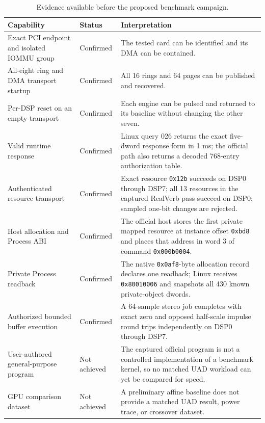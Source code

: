 \documentclass[10pt,twocolumn,twoside]{article}
\begin{document}
\begin{table}[t]
\centering
\caption{Evidence available before the proposed benchmark campaign.}
\label{tab:evidence}
\small
\begin{tabularx}{0.97\textwidth}{@{}p{}p{}X@{}}
\toprule
Capability & Status & Interpretation \\
\midrule
Exact PCI endpoint and isolated IOMMU group & Confirmed & The tested card can be identified and its DMA can be contained. \\
All-eight ring and DMA transport startup & Confirmed & All 16 rings and 64 pages can be published and recovered. \\
Per-DSP reset on an empty transport & Confirmed & Each engine can be pulsed and returned to its baseline without changing the other seven. \\
Valid runtime response & Confirmed & Linux query 026 returns the exact five-dword response form in 1 ms; the official path also returns a decoded 768-entry authorization table. \\
Authenticated resource transport & Confirmed & Exact resource \texttt{0x12b} succeeds on DSP0 through DSP7; all 13 resources in the captured RealVerb pass succeed on DSP0; sampled one-bit changes are rejected. \\
Host allocation and Process ABI & Confirmed & The official host stores the first private mapped resource at instance offset \texttt{0xbd8} and places that address in word 3 of command \texttt{0x000b0004}. \\
Private Process readback & Confirmed & The native \texttt{0x0af8}-byte allocation record declares one readback; Linux receives \texttt{0x80010006} and snapshots all 430 known private-object dwords. \\
Authorized bounded buffer execution & Confirmed & A 64-sample stereo job completes with exact zero and opposed half-scale impulse round trips independently on DSP0 through DSP7. \\
User-authored general-purpose program & Not achieved & The captured official program is not a controlled implementation of a benchmark kernel, so no matched UAD workload can yet be compared for speed. \\
GPU comparison dataset & Not achieved & A preliminary affine baseline does not provide a matched UAD result, power trace, or crossover dataset. \\
\bottomrule
\end{tabularx}
\end{table}
\end{document}
